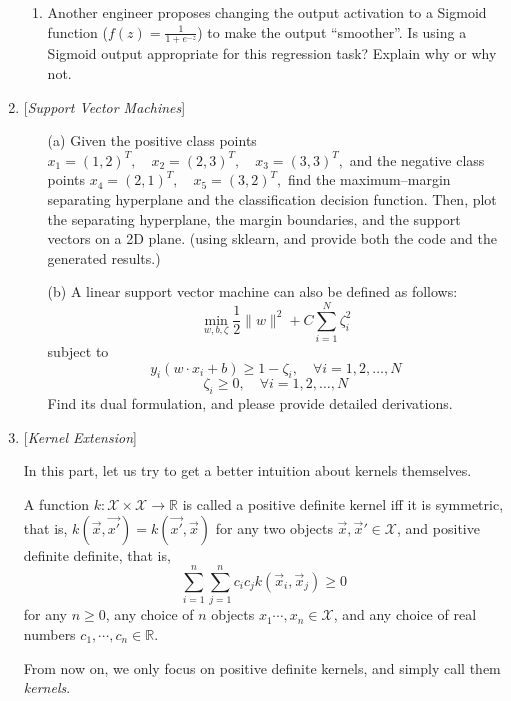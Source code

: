 \documentclass[10pt]{article}
\begin{document}
\begin{enumerate}
\begin{enumerate}
    \item Another engineer proposes changing the output activation to a Sigmoid function ($f(z) = \frac{1}{1+e^{-z}}$) to make the output ``smoother''. Is using a Sigmoid output appropriate for this regression task? Explain why or why not.
\end{enumerate}



\newpage

\item {} {[}\textit{Support Vector Machines}{]} 
\begin{itemize}
	\item[(a)] Given the positive class points
$x_1 = (1, 2)^T,\quad x_2 = (2, 3)^T,\quad x_3 = (3, 3)^T,$ and the negative class points $x_4 = (2, 1)^T,\quad x_5 = (3, 2)^T,$ find the maximum--margin separating hyperplane and the classification decision function. Then, plot the separating hyperplane, the margin boundaries, and the support vectors on a 2D plane. (using sklearn, and provide both the code and the generated results.) 
    
	\item[(b)] A linear support vector machine can also be defined as follows:
$$\min_{w,b,\zeta} \frac{1}{2}\|w\|^2 + C\sum_{i=1}^N \zeta_i^2$$
subject to
$$y_i (w \cdot x_i + b) \ge 1 - \zeta_i, \quad \forall i = 1,2,\ldots,N$$
$$\zeta_i \ge 0, \quad \forall i = 1,2,\ldots,N$$
Find its dual formulation, and please provide detailed derivations. 
    
\end{itemize}


\newpage{}




\item{} {[}\textit{Kernel Extension}{]}
\begin{itemize}
In this part, let us try to get a better intuition about kernels themselves.
\begin{definition}
A function \(k : \mathcal{X \times X} \to \mathbb{R}\) is called a positive definite kernel iff it is symmetric, that is, $k(\vec{x}, \vec{x'}) = k(\vec{x'}, \vec{x})$ for any two objects $\vec x, \vec x' \in\mathcal{X}$, and positive  definite definite, that is,
\[\sum_{i = 1}^n\sum_{j = 1}^nc_ic_jk(\vec{x}_i,\vec{x}_j)\geq 0\]
for any $n \geq 0$, any choice of $n$ objects $x_1\cdots, x_n \in\mathcal{X}$, and any choice of real numbers $c_1,\cdots, c_n \in\mathbb R$.
\end{definition}
From now on, we only focus on positive definite kernels, and simply call them \textit{kernels}.


\end{itemize}
\end{enumerate}
\end{document}
